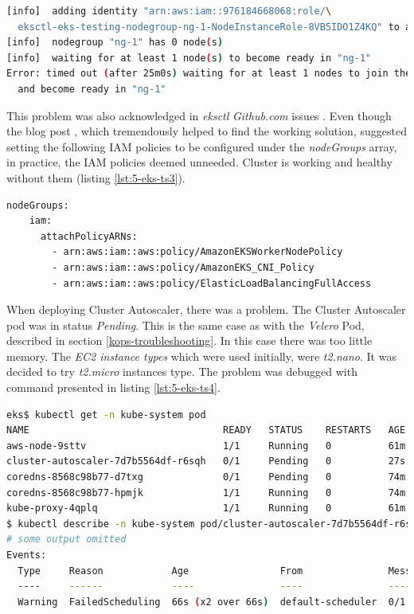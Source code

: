 \begin{lstlisting}[basicstyle=\scriptsize,xleftmargin=0cm,label=lst:5-eks-ts2,caption={Error output from creating \textit{eksctl} cluster},captionpos=b,language=Bash ]
[info]  adding identity "arn:aws:iam::976184668068:role/\
  eksctl-eks-testing-nodegroup-ng-1-NodeInstanceRole-8VB5IDO1Z4KQ" to auth ConfigMap
[info]  nodegroup "ng-1" has 0 node(s)
[info]  waiting for at least 1 node(s) to become ready in "ng-1"
Error: timed out (after 25m0s) waiting for at least 1 nodes to join the cluster\
  and become ready in "ng-1"
\end{lstlisting}
This problem was also acknowledged in \textit{eksctl} \textit{Github.com} issues \cite{eksctl-net-issue2,eksctl-net-issue1}. Even though the blog post \cite{eksctl-net-issue-solution}, which tremendously helped to find the working solution, suggested setting the following IAM policies to be configured under the \textit{nodeGroups} array, in practice, the IAM policies deemed unneeded. Cluster is working and healthy without them (listing \ref{lst:5-eks-ts3}).
\begin{lstlisting}[basicstyle=\scriptsize,xleftmargin=0cm,label=lst:5-eks-ts3,caption={\textit{AWS IAM} policies recommended for \textit{eksctl} by a blog post},captionpos=b,language=Bash ]
nodeGroups:
    iam:
      attachPolicyARNs:
        - arn:aws:iam::aws:policy/AmazonEKSWorkerNodePolicy
        - arn:aws:iam::aws:policy/AmazonEKS_CNI_Policy
        - arn:aws:iam::aws:policy/ElasticLoadBalancingFullAccess
\end{lstlisting}

When deploying Cluster Autoscaler, there was a problem. The Cluster Autoscaler pod was in status \textit{Pending}. This is the same case as with the \textit{Velero} Pod, described in section \ref{kops-troubleshooting}. In this case there was too little memory. The \textit{EC2 instance types} which were used initially, were \textit{t2.nano}. It was decided to try \textit{t2.micro} instances type. The problem was debugged with command presented in listing \ref{lst:5-eks-ts4}.
\begin{lstlisting}[basicstyle=\scriptsize,xleftmargin=0cm,label=lst:5-eks-ts4,caption={Debugging cluster autoscaler},captionpos=b,language=Bash ]
eks$ kubectl get -n kube-system pod
NAME                                  READY   STATUS    RESTARTS   AGE
aws-node-9sttv                        1/1     Running   0          61m
cluster-autoscaler-7d7b5564df-r6sqh   0/1     Pending   0          27s
coredns-8568c98b77-d7txg              0/1     Pending   0          74m
coredns-8568c98b77-hpmjk              1/1     Running   0          74m
kube-proxy-4qplq                      1/1     Running   0          61m
$ kubectl describe -n kube-system pod/cluster-autoscaler-7d7b5564df-r6sqh
# some output omitted
Events:
  Type     Reason            Age                From               Message
  ----     ------            ----               ----               -------
  Warning  FailedScheduling  66s (x2 over 66s)  default-scheduler  0/1 nodes are available: 1 Insufficient memory.
\end{lstlisting}


